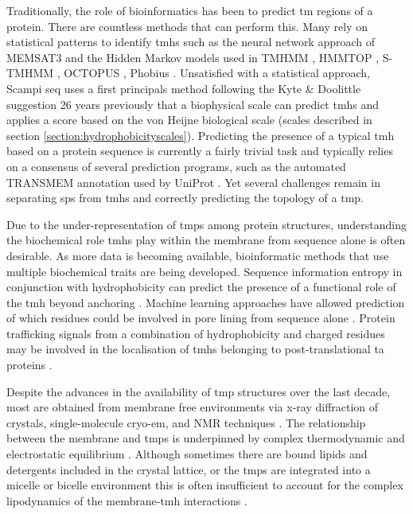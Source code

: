 Traditionally, the role of bioinformatics has been to predict \gls{tm} regions of a protein.
There are countless methods that can perform this.
Many rely on statistical patterns to identify \gls{tmh}s such as the neural network approach of MEMSAT3 \cite{Jones2007} and the Hidden Markov models used in TMHMM \cite{Krogh2001}, HMMTOP \cite{Tusnady2001}, S\--TMHMM \cite{Viklund2004}, OCTOPUS \cite{Viklund2008}, Phobius \cite{Kall2004}.
Unsatisfied with a statistical approach, Scampi seq \cite{Bernsel2008} uses a first principals method following the Kyte \& Doolittle suggestion 26 years previously that a biophysical scale can predict \gls{tmh}s \cite{Kyte1982} and applies a score based on the von Heijne biological scale \cite{Hessa2007} (scales described in section \ref{section:hydrophobicityscales}).
Predicting the presence of a typical \gls{tmh} based on a protein sequence is currently a fairly trivial task and typically relies on a consensus of several prediction programs, such as the automated TRANSMEM annotation used by UniProt \cite{TheUniProtConsortium2014}.
Yet several challenges remain in separating \gls{sp}s from \gls{tmh}s \cite{Petersen2011} and correctly predicting the topology of a \gls{tmp}.

Due to the under\--representation of \gls{tmp}s among protein structures, understanding the biochemical role \gls{tmh}s play within the membrane from sequence alone is often desirable.
As more data is becoming available, bioinformatic methods that use multiple biochemical traits are being developed.
Sequence information entropy in conjunction with hydrophobicity can predict the presence of a functional role of the \gls{tmh} beyond anchoring \cite{Wong2011, Wong2012}.
Machine learning approaches have allowed prediction of which residues could be involved in pore lining from sequence alone \cite{Nugent2012a}.
Protein trafficking signals from a combination of hydrophobicity and charged residues may be involved in the localisation of \gls{tmh}s belonging to post\--translational \gls{ta} proteins \cite{Guna2018}.

Despite the advances in the availability of \gls{tmp} structures over the last decade, most are obtained from membrane free environments via x\--ray diffraction of crystals, single\--molecule cryo\--\gls{em}, and NMR techniques \cite{Vinothkumar2015, Stansfeld2015}.
The relationship between the membrane and \gls{tmp}s is underpinned by complex thermodynamic and electrostatic equilibrium \cite{Cymer2015}.
Although sometimes there are bound lipids and detergents included in the crystal lattice, or the \gls{tmp}s are integrated into a micelle or bicelle environment this is often insufficient to account for the complex lipodynamics of the membrane\--\gls{tmh} interactions \cite{Coskun2011, Stansfeld2015}.

